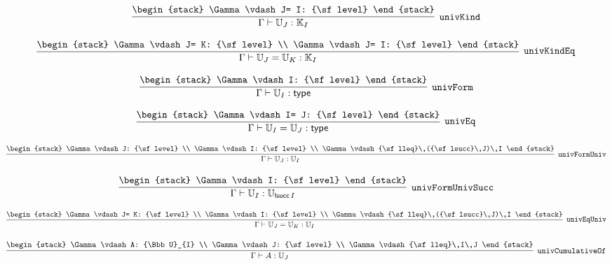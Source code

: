 \[
\infer[{\tt univKind}]{\Gamma \vdash {\Bbb U}_{J}: {\Bbb K}_{I}}{
\begin{stack}
\Gamma \vdash J= I: {\sf level}
\end{stack}}
\]

\[
\infer[{\tt univKindEq}]{\Gamma \vdash {\Bbb U}_{J}= {\Bbb U}_{K}: {\Bbb K}_{I}}{
\begin{stack}
\Gamma \vdash J= K: {\sf level}
\\
\Gamma \vdash J= I: {\sf level}
\end{stack}}
\]

\[
\infer[{\tt univForm}]{\Gamma \vdash {\Bbb U}_{I}: {\sf type}}{
\begin{stack}
\Gamma \vdash I: {\sf level}
\end{stack}}
\]

\[
\infer[{\tt univEq}]{\Gamma \vdash {\Bbb U}_{I}= {\Bbb U}_{J}: {\sf type}}{
\begin{stack}
\Gamma \vdash I= J: {\sf level}
\end{stack}}
\]

\[
\infer[{\tt univFormUniv}]{\Gamma \vdash {\Bbb U}_{J}: {\Bbb U}_{I}}{
\begin{stack}
\Gamma \vdash J: {\sf level}
\\
\Gamma \vdash I: {\sf level}
\\
\Gamma \vdash {\sf lleq}\,({\sf lsucc}\,J)\,I
\end{stack}}
\]

\[
\infer[{\tt univFormUnivSucc}]{\Gamma \vdash {\Bbb U}_{I}: {\Bbb U}_{{\sf lsucc}\,I}}{
\begin{stack}
\Gamma \vdash I: {\sf level}
\end{stack}}
\]

\[
\infer[{\tt univEqUniv}]{\Gamma \vdash {\Bbb U}_{J}= {\Bbb U}_{K}: {\Bbb U}_{I}}{
\begin{stack}
\Gamma \vdash J= K: {\sf level}
\\
\Gamma \vdash I: {\sf level}
\\
\Gamma \vdash {\sf lleq}\,({\sf lsucc}\,J)\,I
\end{stack}}
\]

\[
\infer[{\tt univCumulativeOf}]{\Gamma \vdash A: {\Bbb U}_{J}}{
\begin{stack}
\Gamma \vdash A: {\Bbb U}_{I}
\\
\Gamma \vdash J: {\sf level}
\\
\Gamma \vdash {\sf lleq}\,I\,J
\end{stack}}
\]

